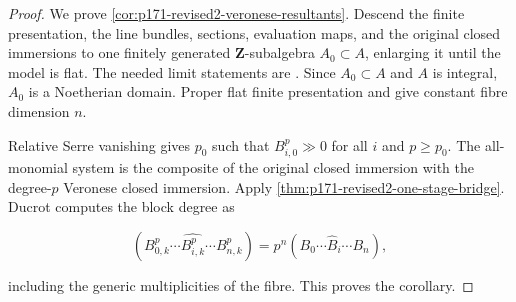 \begin{proof}
We prove \cref{cor:p171-revised2-veronese-resultants}.  Descend the
finite presentation, the line bundles, sections, evaluation maps, and the
original closed immersions to one finitely generated
\(\mathbf Z\)-subalgebra \(A_0\subset A\), enlarging it until the model is
flat.  The needed limit statements are
\cite[Tags~01ZM, 01ZR, 0B8W, and~05LY]{stacks-project}.  Since \(A_0\subset A\)
and \(A\) is integral, \(A_0\) is a Noetherian domain.  Proper flat finite
presentation and \cite[Tag~0D4R]{stacks-project} give constant fibre
dimension \(n\).

Relative Serre vanishing gives \(p_0\) such that \(B_{i,0}^p\gg0\) for all
\(i\) and \(p\geq p_0\).  The all-monomial system is the composite of the
original closed immersion with the degree-\(p\) Veronese closed immersion.
Apply \cref{thm:p171-revised2-one-stage-bridge}.  Ducrot
\cite[Lemma~6.3.1]{Ducrot97CubeIntersection} computes the block degree as

\[
 (B_{0,k}^p\cdots\widehat{B_{i,k}^p}\cdots B_{n,k}^p)
 =p^n(B_0\cdots\widehat B_i\cdots B_n),
\]

including the generic multiplicities of the fibre.  This proves the
corollary.
\end{proof}
